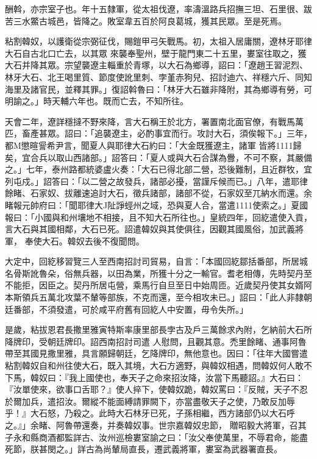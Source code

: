 \begin{pinyinscope}
 酬斡，亦宗室子也。年十五隸軍，從太祖伐遼，率濤溫路兵招撫三坦、石里很、跋苦三水鱉古城邑，皆降之。敗室韋五百於阿良葛城，獲其民眾。至是死焉。



 粘割韓奴，以護衛從宗弼征伐，賜鎧甲弓矢戰馬。初，太祖入居庸關，遼林牙耶律大石自古北口亡去，以其眾
 來襲奉聖州，壁于龍門東二十五里，婁室往取之，獲大石并降其眾。宗望襲遼主輜重於青塚，以大石為鄉導，詔曰：「遼趙王習泥烈、林牙大石、北王喝里質、節度使訛里刺、孛堇赤狗兒、招討迪六、祥穩六斤、同知海里及諸官民，並釋其罪。」復詔斡魯曰：「林牙大石雖非降附，其為鄉導有勞，可明諭之。」時天輔六年也。既而亡去，不知所往。



 天會二年，遼詳穩撻不野來降，言大石稱王於北方，署置南北面官僚，有戰馬萬匹，畜產甚眾。詔曰：「追襲遼主，必酌事宜而行。攻討大石，須俟報下。」三年，都M懲暄諐希尹言，聞夏人與耶律大石約曰：「大金既獲遼主，諸軍
 皆將1111歸矣，宜合兵以取山西諸部。」詔答曰：「夏人或與大石合謀為釁，不可不察，其嚴備之。」七年，泰州路都統婆盧火奏：「大石已得北部二營，恐後難制，且近群牧，宜列屯戍。」詔答曰：「以二營之故發兵，諸部必擾，當謹斥候而已。」八年，遣耶律餘睹、石家奴、拔離速追討大石，徵兵諸部，諸部不從，石家奴至兀納水而還。余睹報元帥府曰：「聞耶律大J阯諍蛵州之域，恐與夏人合，當遣1111使索之。」夏國報曰：「小國與和州壤地不相接，且不知大石所往也。」皇統四年，回紇遣使入貢，言大石與其國相鄰，大石已死。詔遣韓奴與其使俱往，因觀其國風俗，加武義將軍，
 奉使大石。韓奴去後不復聞問。



 大定中，回紇移習覽三人至西南招討司貿易，自言：「本國回紇鄒括番部，所居城名骨斯訛魯朵，俗無兵器，以田為業，所獲十分之一輸官。耆老相傳，先時契丹至不能拒，因臣之。契丹所居屯營，乘馬行自旦至日中始周匝。近歲契丹使其女婿阿本斯領兵五萬北攻葉不輦等部族，不克而還，至今相攻未已。」詔曰：「此人非隸朝廷番部，不須發遣，可於咸平府舊有回紇人中安置，毋令失所。」



 是歲，粘拔恩君長撒里雅寅特斯率康里部長孛古及戶三萬餘求內附，乞納前大石所降牌印，受朝廷牌印。詔西南招討司遣
 人慰問，且觀其意。禿里餘睹、通事阿魯帶至其國見撒里雅，具言願歸朝廷，乞降牌印，無他意也。因曰：「往年大國嘗遣粘割韓奴自和州往使大石，既入其境，大石方適野，與韓奴相遇，問韓奴何人敢不下馬，韓奴曰：『我上國使也，奉天子之命來招汝降，汝當下馬聽詔。』大石曰：『汝單使來，欲事口舌耶？』使人捽下，使韓奴跪，韓奴罵曰：『反賊，天子不忍於爾加兵，遣招汝。爾縱不能面縛請罪闕下，亦當盡敬天子之使，乃敢反加辱乎！』大石怒，乃殺之。此時大石林牙已死，子孫相繼，西方諸部仍以大石呼之。』」余睹、阿魯帶還奏，并奏韓奴事。世宗嘉韓奴忠節，
 贈昭毅大將軍，召其子永和縣商酒都監詳古、汝州巡檢婁室諭之曰：「汝父奉使萬里，不辱君命，能盡死節，朕甚閔之。」詳古為尚輦局直長，遷武義將軍，婁室為武器署直長。




\end{pinyinscope}
